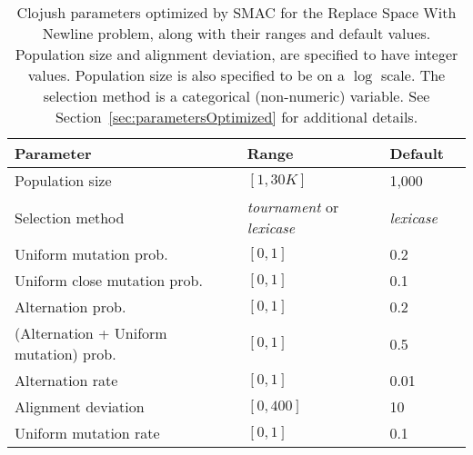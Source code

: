 \begin{table}
	\begin{center}
	\begin{tabular}{p{4cm} p{2cm} ll}
		Parameter & Range & Default \\
		\hline
		Population size & $[1, 30K]$ & 1,000 \\
		Selection method & \emph{tournament} \linebreak or \emph{lexicase} & \emph{lexicase} \\
		\hline
		Uniform mutation prob. & $[0, 1]$ & 0.2 \\
		Uniform close mutation prob. & $[0, 1]$ & 0.1 \\
		Alternation prob. & $[0, 1]$ & 0.2 \\
		(Alternation \linebreak + \quad Uniform mutation) prob. & $[0, 1]$ & 0.5 \\
		\hline
		Alternation rate & $[0, 1]$ & 0.01 \\
		Alignment deviation & $[0, 400]$ & 10 \\
		\hline
		Uniform mutation rate & $[0, 1]$ & 0.1
	\end{tabular}
	\end{center}
	\caption{Clojush parameters optimized by SMAC for the Replace Space With 
		Newline problem, along with their ranges and 
		default values.  Population size and
		alignment deviation, are specified to have integer values.  Population
		size is also specified to be on a $\log$ scale. The selection
		method is a categorical (non-numeric) variable.
		See Section~\ref{sec:parametersOptimized} for additional details.
	}
	\label{tab:clojushParameters}
\end{table}

